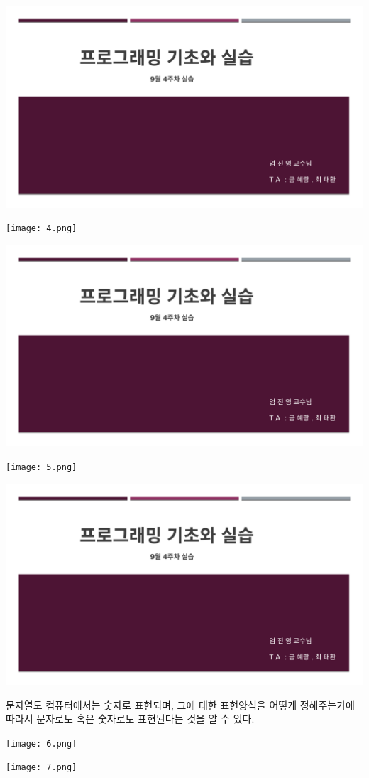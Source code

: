 \documentclass[11pt,a4paper]{article}
\begin{document}
\begin{enumerate}
\includegraphics[page=6, width=\textwidth]{1.pdf}
	
\texttt{[image: 4.png]}	


\includegraphics[page=7, width=\textwidth]{1.pdf}
	
\texttt{[image: 5.png]}	


\includegraphics[page=8, width=\textwidth]{1.pdf}


문자열도 컴퓨터에서는 숫자로 표현되며, 그에 대한 표현양식을 어떻게 정해주는가에 따라서 문자로도 혹은 숫자로도 표현된다는 것을 알 수 있다.

\texttt{[image: 6.png]}	
	
\texttt{[image: 7.png]}	
\end{enumerate}
\end{document}
